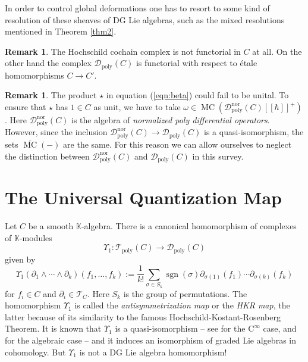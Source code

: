 \documentclass{conm-p-l}
\theoremstyle{definition}
\newtheorem{rem}[equation]{Remark}
\numberwithin{equation}{section}
\newcommand{\ol}{\overline}
\newcommand{\opn}{\operatorname}
\newcommand{\mcal}[1]{\mathcal{#1}}
\newcommand{\mrm}[1]{\mathrm{#1}}
\newcommand{\mbb}[1]{\mathbb{#1}}
\newcommand{\K}{\mbb{K}}
\newcommand{\smfrac}[2]{\textstyle \frac{#1}{#2}}
\begin{document}
In order to control global deformations one has to resort to some 
kind of resolution of these sheaves of DG Lie algebras, such as the 
mixed resolutions mentioned in Theorem \ref{thm2}.

\begin{rem}
The Hochschild cochain complex is not
functorial in $C$ at all. On the other hand the complex 
$\mcal{D}^{}_{\mrm{poly}}(C)$ is functorial with respect to \'etale
homomorphisms $C \to C'$. 
\end{rem}

\begin{rem}
The product $\star$ in equation (\ref{eqn:beta}) could fail to be unital. 
To ensure that $\star$ has $1 \in C$ as unit, we have to take 
$\omega \in \opn{MC}(\mcal{D}^{\mrm{nor}}_{\mrm{poly}}(C)[[\hbar]]^+)$.
Here $\mcal{D}^{\mrm{nor}}_{\mrm{poly}}(C)$ is the algebra of {\em normalized
poly differential operators}. However, since the inclusion 
$\mcal{D}^{\mrm{nor}}_{\mrm{poly}}(C) \to \mcal{D}^{}_{\mrm{poly}}(C)$ 
is a quasi-isomorphism, the sets $\ol{\opn{MC}}(-)$ are the same. 
For this reason we can allow ourselves to neglect the distinction between
$\mcal{D}^{\mrm{nor}}_{\mrm{poly}}(C)$ and 
$\mcal{D}_{\mrm{poly}}(C)$ in this survey.
\end{rem}



\section{The Universal Quantization Map}

Let $C$ be a smooth $\K$-algebra. 
There is a canonical homomorphism of complexes of $\K$-modules
\[ \Upsilon_1 : \mcal{T}_{\mrm{poly}}(C) \to
\mcal{D}_{\mrm{poly}}(C) \]
given by
\[ \Upsilon_1(\partial_1 \wedge \cdots \wedge \partial_k)
(f_1, \ldots, f_k) := 
\smfrac{1}{k!} \sum_{\sigma \in S_k} \opn{sgn}(\sigma)
\partial_{\sigma(1)}(f_1) \cdots \partial_{\sigma(k)}(f_k) \]
for $f_i \in C$ and $\partial_i \in \mcal{T}_C$. 
Here $S_k$ is the group of permutations.
The homomorphism $\Upsilon_1$ is called the {\em antisymmetrization map}
or the {\em HKR map}, the latter because of its similarity to the famous
Hochschild-Kostant-Rosenberg Theorem. 
It is known that $\Upsilon_1$ is a quasi-isomorphism --
see \cite{Ko1} for the $\mrm{C}^{\infty}$ case,
and \cite{Ye1} for the algebraic case  --
and it induces an isomorphism of graded Lie algebras in cohomology. 
But $\Upsilon_1$ is not a DG Lie algebra homomorphism!
\end{document}
